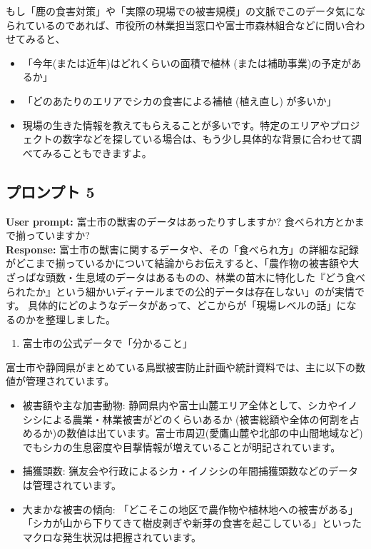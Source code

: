 \documentclass[a4paper, 11pt]{jsarticle}
\begin{document}
もし「鹿の食害対策」や「実際の現場での被害規模」の文脈でこのデータ気になられているのであれば、市役所の林業担当窓口や富士市森林組合などに問い合わせてみると、
\begin{itemize}
    \item 「今年(または近年)はどれくらいの面積で植林 (または補助事業)の予定があるか」
    \item 「どのあたりのエリアでシカの食害による補植 (植え直し) が多いか」
    \item 現場の生きた情報を教えてもらえることが多いです。特定のエリアやプロジェクトの数字などを探している場合は、もう少し具体的な背景に合わせて調べてみることもできますよ。
\end{itemize}

\subsection{プロンプト 5}
\noindent\textbf{User prompt:} 富士市の獣害のデータはあったりすしますか? 食べられ方とかまで揃っていますか? \\
\noindent\textbf{Response:} 富士市の獣害に関するデータや、その「食べられ方」の詳細な記録がどこまで揃っているかについて結論からお伝えすると、「農作物の被害額や大ざっぱな頭数・生息域のデータはあるものの、林業の苗木に特化した『どう食べられたか』という細かいディテールまでの公的データは存在しない」のが実情です。
具体的にどのようなデータがあって、どこからが「現場レベルの話」になるのかを整理しました。
\begin{enumerate}
    \item 富士市の公式データで「分かること」
\end{enumerate}
富士市や静岡県がまとめている鳥獣被害防止計画や統計資料では、主に以下の数値が管理されています\cite{ref4}。
\begin{itemize}
    \item 被害額や主な加害動物: 静岡県内や富士山麓エリア全体として、シカやイノシシによる農業・林業被害がどのくらいあるか (被害総額や全体の何割を占めるか)の数値は出ています。富士市周辺(愛鷹山麓や北部の中山間地域など) でもシカの生息密度や目撃情報が増えていることが明記されています\cite{ref4}。
    \item 捕獲頭数: 猟友会や行政によるシカ・イノシシの年間捕獲頭数などのデータは管理されています\cite{ref4}。
    \item 大まかな被害の傾向: 「どこそこの地区で農作物や植林地への被害がある」 「シカが山から下りてきて樹皮剥ぎや新芽の食害を起こしている」といったマクロな発生状況は把握されています\cite{ref4}。
\end{itemize}
\end{document}
